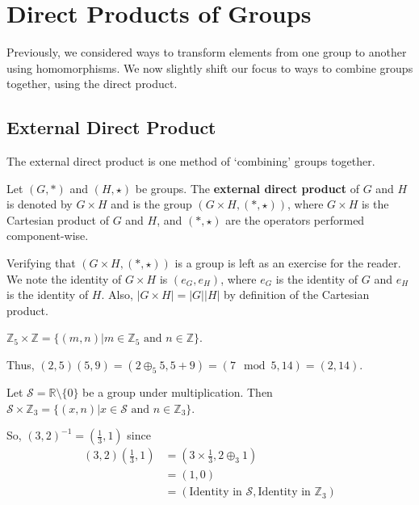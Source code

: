 \chapter{Direct Products of Groups}
Previously, we considered ways to transform elements from one group to another using homomorphisms. We now slightly shift our focus to ways to combine groups together, using the direct product.

\section{External Direct Product}
The external direct product is one method of `combining' groups together.
\begin{definition}
    Let $(G, \ast)$ and $(H, \star)$ be groups. The \textbf{external direct product} of $G$ and $H$ is denoted by $G\times H$ and is the group $(G\times H, (\ast, \star))$, where $G\times H$ is the Cartesian product of $G$ and $H$, and $(\ast, \star)$ are the operators performed component-wise.
\end{definition}
Verifying that $(G\times H, (\ast, \star))$ is a group is left as an exercise for the reader. We note the identity of $G \times H$ is $(e_G, e_H)$, where $e_G$ is the identity of $G$ and $e_H$ is the identity of $H$. Also, $|G \times H| = |G||H|$ by definition of the Cartesian product.

\begin{example}
    $\mathbb{Z}_5 \times \mathbb{Z} = \{(m,n) \vert m \in \mathbb{Z}_5 \text{ and } n \in \mathbb{Z}\}$.

    Thus, $(2, 5)(5, 9) = (2 \oplus_5 5, 5 + 9) = (7 \mod 5, 14) = (2, 14)$.
\end{example}

\begin{example}
    Let $\mathcal{S} = \mathbb{R}\setminus\{0\}$ be a group under multiplication. Then $\mathcal{S} \times \mathbb{Z}_3 = \{ (x, n) \vert x \in \mathcal{S} \text{ and } n \in \mathbb{Z}_3\}$.

    So, $(3, 2)^{-1} = \left(\frac13, 1\right)$ since
    \begin{align*}
        (3, 2)\left(\frac13, 1\right) &= \left(3 \times \frac13, 2 \oplus_3 1\right)\\
        &= (1, 0)\\
        &= (\text{Identity in }\mathcal{S}, \text{Identity in }\mathbb{Z}_3)
    \end{align*}
\end{example}

